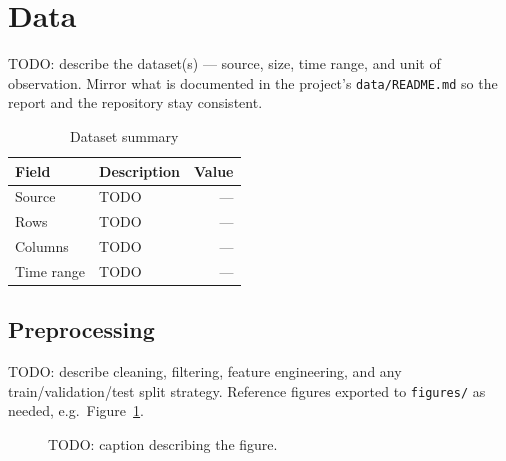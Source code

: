 \section{Data}
\label{sec:data}

TODO: describe the dataset(s) — source, size, time range, and unit of
observation. Mirror what is documented in the project's
\texttt{data/README.md} so the report and the repository stay consistent.

\begin{table}[htbp]
    \centering
    \caption{Dataset summary}
    \label{tab:dataset-summary}
    \begin{tabular}{@{}llr@{}}
        \toprule
        \textbf{Field} & \textbf{Description} & \textbf{Value} \\
        \midrule
        Source        & TODO & --- \\
        Rows          & TODO & --- \\
        Columns       & TODO & --- \\
        Time range    & TODO & --- \\
        \bottomrule
    \end{tabular}
\end{table}

\subsection{Preprocessing}

TODO: describe cleaning, filtering, feature engineering, and any
train/validation/test split strategy. Reference figures exported to
\texttt{figures/} as needed, e.g.\ Figure~\ref{fig:example}.

\begin{figure}[htbp]
    \centering
    \caption{TODO: caption describing the figure.}
    \label{fig:example}
\end{figure}
